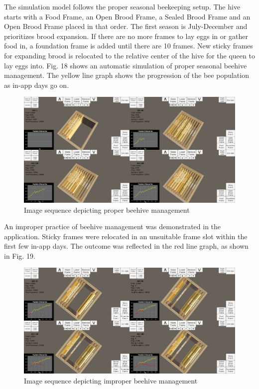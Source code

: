 \documentclass[journal]{./IEEE/IEEEtran}
\begin{document}
\indent The simulation model follows the proper seasonal beekeeping setup. The hive starts with a Food Frame, an Open Brood Frame, a Sealed Brood Frame and an Open Brood Frame placed in that order. The first season is July-December and prioritizes brood expansion. If there are no more frames to lay eggs in or gather food in, a foundation frame is added until there are 10 frames. New sticky frames for expanding brood is relocated to the relative center of the hive for the queen to lay eggs into.
\newline
\indent Fig. 18 shows an automatic simulation of proper seasonal beehive management. The yellow line graph shows the progression of the bee population as in-app days go on.
\begin{figure}[H]
\includegraphics[scale=0.2625]{./images/automatic-proper-mgt.png}
\centering
\caption{Image sequence depicting proper beehive management}
\end{figure}
An improper practice of beehive management was demonstrated in the application. Sticky frames were relocated in an unsuitable frame slot within the first few in-app days. The outcome was reflected in the red line graph, as shown in Fig. 19.
\begin{figure}[H]
\includegraphics[scale=0.2625]{./images/automatic-improper-mgt.png}
\centering
\caption{Image sequence depicting improper beehive management}
\end{figure}
\end{document}
